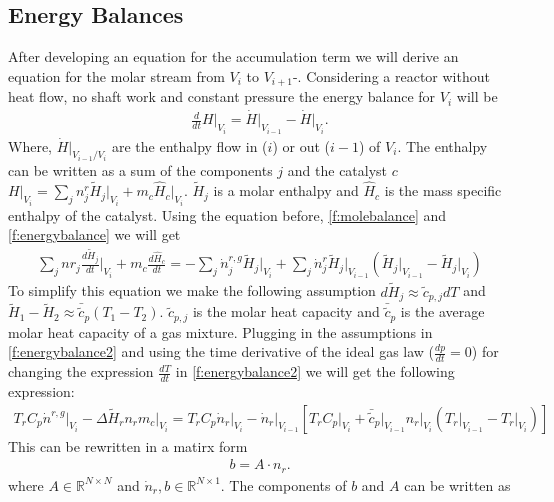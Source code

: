 \documentclass[paper=letter, fontsize=12pt]{article}
\begin{document}
\subsection{Energy Balances} \label{s:energyBalance}
After developing an equation for the accumulation term we will derive an equation for the molar stream from $V_i$ to $V_{i+1}$-.  Considering a reactor without heat flow, no shaft work and constant pressure the energy balance for $V_i$ will be
\begin{align}
\frac{d}{dt} H \Big|_{V_i} = \dot{H}\Big|_{V_{i-1}} - \dot{H}\Big|_{V_{i}}. \label{f:energybalance}
\end{align}
Where, $\dot{H}\Big|_{V_{i-1}/V_i}$ are the enthalpy flow in ($i$) or out ($i-1$) of $V_i$. The enthalpy can be written as a sum of the components $j$ and the catalyst $c$ $H \Big|_{V_i}=\sum_j n^r_j \tilde{H}_j \Big|_{V_i} + m_c \hat{H}_c \Big|_{V_i}$. $\tilde{H}_j$ is a molar enthalpy and $\hat{H}_c$ is the mass specific enthalpy of the catalyst. Using the equation before, \autoref{f:molebalance} and \autoref{f:energybalance} we will get
\begin{align}
\sum_j nr_j \frac{d\tilde{H}_j}{dt} \Big|_{V_i} + m_c \frac{d\hat{H}_c}{dt}=
-\sum_j \dot{n}^{r,g}_j\tilde{H}_j \Big|_{V_i} + 
\sum_j \dot{n}^{r}_j\tilde{H}_j \Big|_{V_{i-1}} \left( \tilde{H}_j \Big|_{V_{i-1}} - \tilde{H}_j \Big|_{V_{i}} \right) \label{f:energybalance2}
\end{align}
To simplify this equation we make the following assumption $d\tilde{H}_j \approx \tilde{c}_{p,j} dT$ and $\tilde{H}_1 - \tilde{H}_2 \approx \bar{\tilde{c}}_p \left( T_1- T_2 \right)$. $\tilde{c}_{p,j}$ is the molar heat capacity and $\bar{\tilde{c}}_p$ is the average molar heat capacity of a gas mixture. Plugging in the assumptions in \autoref{f:energybalance2} and using the time derivative of the ideal gas law ($\frac{dp}{dt}=0$) for changing the expression $\frac{dT}{dt}$ in \autoref{f:energybalance2} we will get the following expression:
\begin{align}
T_rC_p\dot{n}^{r,g} \Big|_{V_i} - \Delta \tilde{H}_r n_r m_c \Big|_{V_i} =
T_rC_p \dot{n}_r \Big|_{V_i} - 
\dot{n}_r \Big|_{V_{i-1}}
\left[
T_rC_p \Big|_{V_i} + \bar{\tilde{c}}_p \Big|_{V_{i-1}} n_r \Big|_{V_i}
\left(
T_r\Big|_{V_{i-1}} - T_r \Big|_{V_i}
\right)
\right]
\end{align}
This can be rewritten in a matirx form
\begin{align}
b=A \cdot {n}_r.  \label{f:energyMatrix}
\end{align}
where $A \in \mathbb{R}^{N \times N}$ and $\dot{n}_r, b \in \mathbb{R}^{N \times 1}$. The components of $b$ and $A$ can be written as
\end{document}
